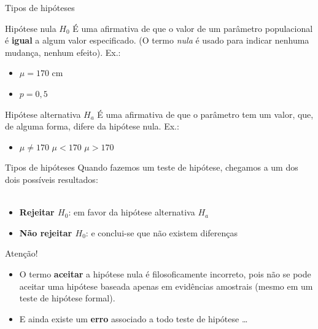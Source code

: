 \documentclass[10pt]{beamer}\usepackage[]{graphicx}\usepackage[]{color}
\theoremstyle{definition}
\begin{document}
\begin{frame}{Tipos de hipóteses}
  \begin{block}{Hipótese nula $H_0$}
    É uma afirmativa de que o valor de um parâmetro populacional é
    \textbf{igual} a algum valor especificado. (O termo \textit{nula} é
    usado para indicar nenhuma mudança, nenhum efeito). Ex.:
    \begin{itemize}
    \item $\mu = 170$ cm
    \item $p = 0,5$
    \end{itemize}
  \end{block}
\begin{block}{Hipótese alternativa $H_a$}
    É uma afirmativa de que o parâmetro tem um valor, que, de alguma
    forma, difere da hipótese nula. Ex.:
    \begin{itemize}
    \item $\mu \neq 170$ \qquad $\mu < 170$ \qquad $\mu > 170$
    \end{itemize}
  \end{block}
\end{frame}

\begin{frame}{Tipos de hipóteses}
  Quando fazemos um teste de hipótese, chegamos a um dos dois
  possíveis resultados: \\~\\
  \begin{itemize}
  \item \textbf{Rejeitar $H_0$}: em favor da hipótese alternativa $H_a$
  \item \textbf{Não rejeitar $H_0$}: e conclui-se que não existem
    diferenças
  \end{itemize}
  \vspace{1em}
  \begin{alertblock}{Atenção!}
    \begin{itemize}
    \item O termo \textbf{aceitar} a hipótese nula é filosoficamente
      incorreto, pois não se pode aceitar uma hipótese baseada apenas em
      evidências amostrais (mesmo em um teste de hipótese formal).
      \item E ainda existe um \textbf{erro} associado a todo teste de
        hipótese \ldots
    \end{itemize}

  \end{alertblock}
\end{frame}
\end{document}
